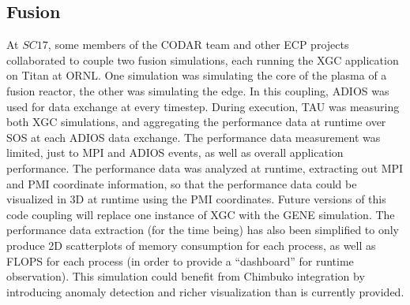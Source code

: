 \subsection{Fusion}
At $SC17$, some members of the CODAR team and other ECP projects collaborated to couple two fusion simulations, each running the XGC application on Titan at ORNL.  One simulation was simulating the core of the plasma of a fusion reactor, the other was simulating the edge. In this coupling, ADIOS was used for data exchange at every timestep.  During execution, TAU was measuring both XGC simulations, and aggregating the performance data at runtime over SOS at each ADIOS data exchange. The performance data measurement was limited, just to MPI and ADIOS events, as well as overall application performance.  The performance data was analyzed at runtime, extracting out MPI and PMI coordinate information, so that the performance data could be visualized in 3D at runtime using the PMI coordinates.  Future versions of this code coupling will replace one instance of XGC with the GENE simulation.  The performance data extraction (for the time being) has also been simplified to only produce 2D scatterplots of memory consumption for each process, as well as FLOPS for each process (in order to provide a ``dashboard'' for runtime observation).  This simulation could benefit from Chimbuko integration by introducing anomaly detection and richer visualization than is currently provided. 
